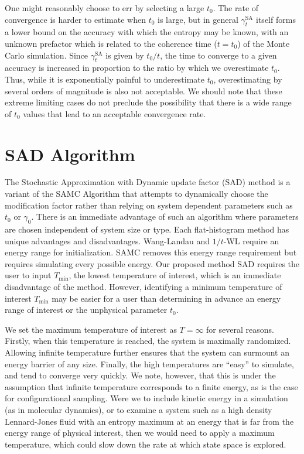 \documentclass[letterpaper,twocolumn,amsmath,amssymb,pre,aps,10pt]{revtex4-1}
\begin{document}
One might reasonably choose to err by selecting a large $t_0$. The rate of
convergence is harder to estimate when $t_0$ is large, but in general
$\gamma_t^{\text{SA}}$ itself forms a lower bound on the accuracy with which the
entropy may be known, with an unknown prefactor which is related to the
coherence time ($t = t_0$) of the Monte Carlo simulation.  Since
$\gamma_t^{\text{SA}}$ is given by $t_0/t$, the time to converge to a given
accuracy is increased in proportion to the ratio by which we overestimate $t_0$.
Thus, while it is exponentially painful to underestimate $t_0$, overestimating
by several orders of magnitude is also not acceptable.  We should note that
these extreme limiting cases do not preclude the possibility that there is a
wide range of $t_0$ values that lead to an acceptable convergence rate.

\section{SAD Algorithm}\label{sec:sad}
The Stochastic Approximation with Dynamic update factor (SAD) method
is a variant of the SAMC Algorithm that attempts to dynamically choose
the modification factor rather than relying on system dependent
parameters such as $t_0$ or $\gamma_0$.  There is an immediate
advantage of such an algorithm where parameters are chosen independent
of system size or type. Each flat-histogram method has unique
advantages and disadvantages.  Wang-Landau and $1/t$-WL require an
energy range for initialization.  SAMC removes this energy range
requirement but requires simulating every possible energy. Our
proposed method SAD requires the user to input $T_\text{min}$, the
lowest temperature of interest, which is an immediate disadvantage of
the method. However, identifying a minimum temperature of interest
$T_\text{min}$ may be easier for a user than determining in advance
an energy range of interest or the unphysical parameter $t_0$.

We set the maximum temperature of interest as $T=\infty$ for several reasons.
Firstly, when this temperature is reached, the system is maximally randomized.
Allowing infinite temperature further ensures that the system can surmount an
energy barrier of any size.  Finally, the high temperatures are ``easy'' to
simulate, and tend to converge very quickly.  We note, however, that this is
under the assumption that infinite temperature corresponds to a finite energy,
as is the case for configurational sampling.  Were we to include kinetic energy
in a simulation (as in molecular dynamics), or to examine a system such as a
high density Lennard-Jones fluid with an entropy maximum at an energy that is
far from the energy range of physical interest, then we would need to apply a
maximum temperature, which could slow down the rate at which state space is
explored.
\end{document}
